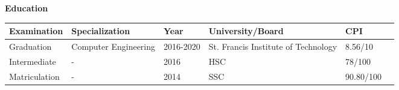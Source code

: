 \colorbox{titleColor}{\parbox{6.7in}{\textbf{Education}}}
\vspace{-3pt}
\begin{table}[ht]
    \hspace{0.8cm}
    \begin{tabular}{llllll}
        \hline
        \textbf{Examination} & \textbf{Specialization} & \textbf{Year} & \textbf{University/Board}
        & \textbf{CPI}
        \\
        \hline
        Graduation           & Computer Engineering    & 2016-2020     & St. Francis Institute of Technology & 8.56/10      \\
        Intermediate         & -                       & 2016          & HSC                                 & 78/100       \\
        Matriculation        & -                       & 2014          & SSC                                 & 90.80/100    \\
        \hline
    \end{tabular}
\end{table}